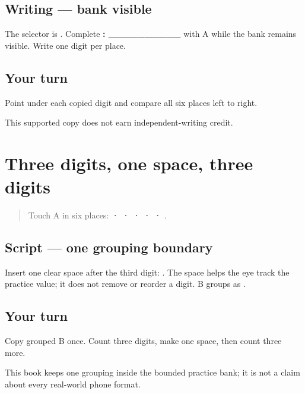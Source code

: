 \subsection*{Writing — bank visible}
The selector is \textbf{}. Complete \textbf{: \_\_\_\_\_\_\_\_\_\_} with A while the bank remains visible. Write one digit per place.

\subsection*{Your turn}
Point under each copied digit and compare all six places left to right.

\begin{tcolorbox}[breakable,colback=teal!4,colframe=teal!35!black,title={Before you move on}]
This supported copy does not earn independent-writing credit.
\end{tcolorbox}
\section[\texorpdfstring{\pa{੦੧੨} \pa{੨੫੧} (three digits …)}{੦੧੨ ੨੫੧ (three digits …)}]{Three digits, one space, three digits}

\label{lesson:PA-W08-phone-grouping}



\begin{quote}
Touch A in six places: \textbf{ ·  ·  ·  ·  · }.
\end{quote}

\subsection*{Script — one grouping boundary}
Insert one clear space after the third digit: \textbf{ }. The space helps the eye track the practice value; it does not remove or reorder a digit. B groups as \textbf{ }.

\subsection*{Your turn}
Copy grouped B once. Count three digits, make one space, then count three more.

\begin{tcolorbox}[breakable,colback=teal!4,colframe=teal!35!black,title={Before you move on}]
This book keeps one grouping inside the bounded practice bank; it is not a claim about every real-world phone format.
\end{tcolorbox}
